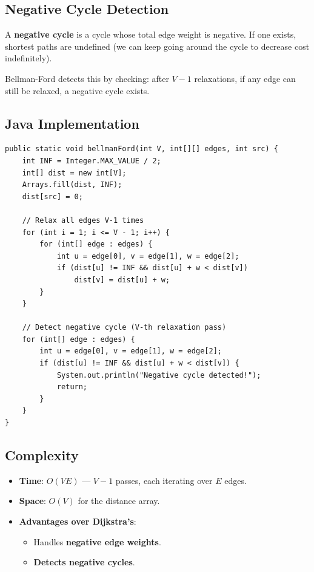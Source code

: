 \documentclass[12pt,a4paper]{article}
\begin{document}
\subsection{Negative Cycle Detection}
A \textbf{negative cycle} is a cycle whose total edge weight is negative. If one exists, shortest paths are undefined (we can keep going around the cycle to decrease cost indefinitely).

Bellman-Ford detects this by checking: after $V-1$ relaxations, if any edge can still be relaxed, a negative cycle exists.

\subsection{Java Implementation}
\begin{lstlisting}[style=javastyle, caption={Bellman-Ford Algorithm — Java}]
public static void bellmanFord(int V, int[][] edges, int src) {
    int INF = Integer.MAX_VALUE / 2;
    int[] dist = new int[V];
    Arrays.fill(dist, INF);
    dist[src] = 0;

    // Relax all edges V-1 times
    for (int i = 1; i <= V - 1; i++) {
        for (int[] edge : edges) {
            int u = edge[0], v = edge[1], w = edge[2];
            if (dist[u] != INF && dist[u] + w < dist[v])
                dist[v] = dist[u] + w;
        }
    }

    // Detect negative cycle (V-th relaxation pass)
    for (int[] edge : edges) {
        int u = edge[0], v = edge[1], w = edge[2];
        if (dist[u] != INF && dist[u] + w < dist[v]) {
            System.out.println("Negative cycle detected!");
            return;
        }
    }
}
\end{lstlisting}

\subsection{Complexity}
\begin{itemize}
    \item \textbf{Time}: $O(VE)$ — $V-1$ passes, each iterating over $E$ edges.
    \item \textbf{Space}: $O(V)$ for the distance array.
    \item \textbf{Advantages over Dijkstra's}:
    \begin{itemize}
        \item Handles \textbf{negative edge weights}.
        \item \textbf{Detects negative cycles}.
    \end{itemize}
\end{itemize}
\end{document}
